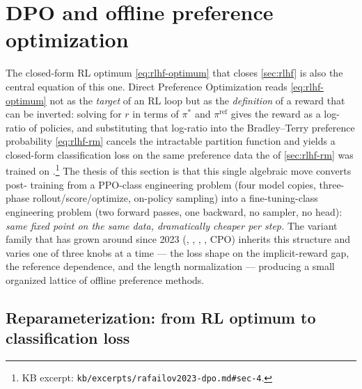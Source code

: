 
\section{DPO and offline preference optimization}
\label{sec:dpo}

The closed-form RL optimum \cref{eq:rlhf-optimum} that closes
\cref{sec:rlhf} is also the central equation of this one. Direct
Preference Optimization \citep{rafailov2023-dpo} reads
\cref{eq:rlhf-optimum} not as the \emph{target} of an RL loop but as the
\emph{definition} of a reward that can be inverted: solving for $r$ in
terms of $\pi^*$ and $\pi^{\mathrm{ref}}$ gives the reward as a
log-ratio of policies, and substituting that log-ratio into the
Bradley--Terry preference probability \cref{eq:rlhf-rm} cancels the
intractable partition function and yields a closed-form classification
loss on the same preference data the  of
\cref{sec:rlhf-rm} was trained on \citep[\S 4]{rafailov2023-dpo}.\footnote{KB
excerpt: \nolinkurl{kb/excerpts/rafailov2023-dpo.md#sec-4}.} The thesis
of this section is that this single algebraic move converts post-
training from a PPO-class engineering problem (four model copies, three-
phase rollout/score/optimize, on-policy sampling) into a
fine-tuning-class engineering problem (two forward passes, one backward,
no sampler, no  head): \emph{same fixed point on the same data,
dramatically cheaper per step.} The variant family that has grown
around  since 2023 (, , , , CPO) inherits this
structure and varies one of three knobs at a time --- the loss shape on
the implicit-reward gap, the reference dependence, and the length
normalization --- producing a small organized lattice of offline
preference methods.

\subsection{Reparameterization: from RL optimum to classification loss}
\label{sec:dpo-derivation}

